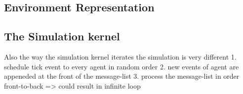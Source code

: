 
\subsection{Environment Representation}

\subsection{The Simulation kernel}
Also the way the simulation kernel iterates the simulation is very different
1. schedule tick event to every agent in random order
2. new events of agent are appeneded at the front of the message-list
3. process the message-list in order front-to-back => could result in infinite loop

